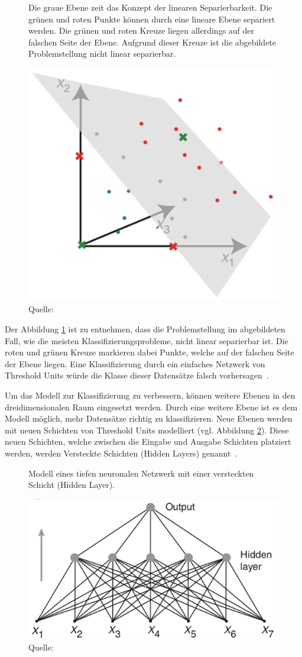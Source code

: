 \begin{figure}[h]
    \captionsetup{width=.9\linewidth}
    \caption{Die graue Ebene zeit das Konzept der linearen Separierbarkeit. Die grünen und roten Punkte können durch eine lineare Ebene separiert werden. Die grünen und roten Kreuze liegen allerdings auf der falschen Seite der Ebene. Aufgrund dieser Kreuze ist die abgebildete Problemstellung nicht linear separierbar.}
    \label{krogh:b}
    \centering
    \includegraphics[width=0.4\linewidth]{graphics/krogh/krogh_plane.png}
    \caption*{Quelle: \textcite{Krogh2008}}
\end{figure}

Der Abbildung \ref{krogh:b} ist zu entnehmen, dass die Problemstellung im abgebildeten Fall, wie die meisten Klassifizierungsprobleme, nicht linear separierbar ist. Die roten und grünen Kreuze markieren dabei Punkte, welche auf der falschen Seite der Ebene liegen. Eine Klassifizierung durch ein einfaches Netzwerk von Threshold Units würde die Klasse dieser Datensätze falsch vorhersagen~\autocite{Krogh2008}.

Um das Modell zur Klassifizierung zu verbessern, können weitere Ebenen in den dreidimensionalen Raum eingesetzt werden. Durch eine weitere Ebene ist es dem Modell möglich, mehr Datensätze richtig zu klassifizieren. Neue Ebenen werden mit neuen Schichten von Threshold Units modelliert (vgl. Abbildung \ref{krogh:c}). Diese neuen Schichten, welche zwischen die Eingabe und Ausgabe Schichten platziert werden, werden Versteckte Schichten (Hidden Layers) genannt~\autocite{Krogh2008}.

\begin{figure}[h]
    \captionsetup{width=.9\linewidth}
    \caption{Modell eines tiefen neuronalen Netzwerk mit einer versteckten Schicht (Hidden Layer).}
    \label{krogh:c}
    \centering
    \includegraphics[width=0.4\linewidth]{graphics/krogh/krogh_deep-network.png}
    \caption*{Quelle: \textcite{Krogh2008}}
\end{figure}

